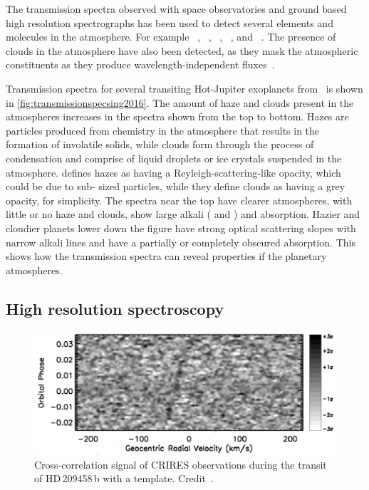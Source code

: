 The transmission spectra observed with space observatories and ground based high resolution spectrographs has been used to detect several elements and molecules in the atmosphere.
For example ~\citep{charbonneau_detection_2002, redfield_sodium_2008, wyttenbach_spectrally_2015, nikolov_vlt_2016}, ~\citep{tinetti_water_2007, brogi_carbon_2014}, ~\citep{brogi_carbon_2014, snellen_mass_2018}, ~\citep{redfield_extrasolar_2010},  and ~\citep{hoeijmakers_atomic_2018}.
The presence of clouds in the atmosphere have also been detected, as they mask the atmospheric constituents as they produce wavelength-independent fluxes~\citep[e.g.][]{barman_clouds_2011, kreidberg_clouds_2014, sing_continuum_2016}.

Transmission spectra for several transiting Hot-Jupiter exoplanets from~\citet{sing_continuum_2016} is shown in \cref{fig:transmissionspecsing2016}.
The amount of haze and clouds present in the atmospheres increases in the spectra shown from the top to bottom.
Hazes are particles produced from chemistry in the atmosphere that results in the formation of involatile solids, while clouds form through the process of condensation and comprise of liquid droplets or ice crystals suspended in the atmosphere.
\citet{sing_continuum_2016} defines hazes as having a {Reyleigh}-scattering-like opacity, which could be due to sub-\um{} sized particles, while they define clouds as having a grey opacity, for simplicity.
The spectra near the top have clearer atmospheres, with little or no haze and clouds, show large alkali ( and ) and  absorption.
Hazier and cloudier planets lower down the figure have strong optical scattering slopes with narrow alkali lines and have a partially or completely obscured  absorption.
This shows how the transmission spectra can reveal properties if the planetary atmospheres.

\subsection{High resolution spectroscopy}
\label{subsec:high_resolution_spectroscopy}

\begin{figure}
    \centering
    \includegraphics[width=0.7\linewidth]{figures/introduction/snellen2010}
    \caption[Cross-correlation signal from {CRIRES} observations of HD\,209458\,b.]{Cross-correlation signal of {CRIRES} observations during the transit of HD\,209458\,b with a  template.
    Credit~\citet{snellen_orbital_2010}.}
    \label{fig:snellen2010}
\end{figure}

